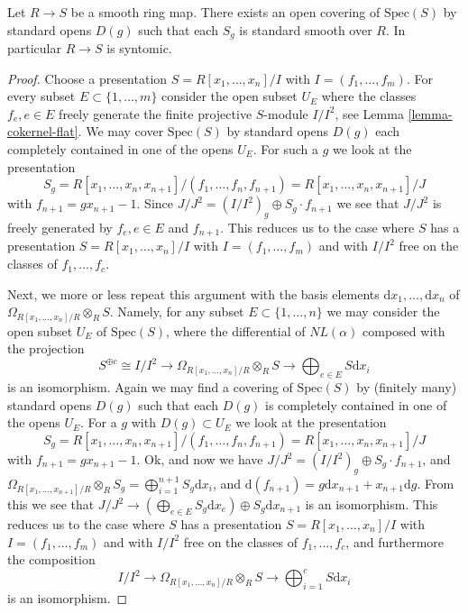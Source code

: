 \begin{lemma}
\label{lemma-smooth-syntomic}
Let $R \to S$ be a smooth ring map.
There exists an open covering of $\text{Spec}(S)$ by
standard opens $D(g)$ such that each $S_g$ is standard smooth
over $R$. In particular $R \to S$ is syntomic.
\end{lemma}

\begin{proof}
Choose a presentation $S = R[x_1, \ldots, x_n]/I$
with $I = (f_1, \ldots, f_m)$. For every subset
$E \subset \{1, \ldots, m\}$ consider the open
subset $U_E$ where the classes $f_e, e\in E$ freely generate
the finite projective $S$-module $I/I^2$, see Lemma \ref{lemma-cokernel-flat}.
We may cover $\text{Spec}(S)$ by standard opens $D(g)$ each
completely contained in one of the opens $U_E$. For such a $g$
we look at the presentation
$$
S_g =
R[x_1, \ldots, x_n, x_{n + 1}]/(f_1, \ldots, f_n, f_{n + 1}) =
R[x_1, \ldots, x_n, x_{n + 1}]/J
$$
with $f_{n + 1} = g x_{n + 1} - 1$. Since
$J/J^2 = (I/I^2)_g \oplus S_g \cdot f_{n + 1}$
we see that $J/J^2$ is freely generated by $f_e, e \in E$ and $f_{n + 1}$.
This reduces us to the case where $S$ has a presentation
$S = R[x_1, \ldots, x_n]/I$ with $I = (f_1, \ldots, f_m)$ and
with $I/I^2$ free on the classes of $f_1, \ldots, f_c$.

\medskip\noindent
Next, we more or less repeat this argument with
the basis elements $\text{d}x_1, \ldots, \text{d}x_n$
of $\Omega_{R[x_1, \ldots, x_n]/R} \otimes_R S$.
Namely, for any subset $E \subset \{1, \ldots, n\}$ we may
consider the open subset $U_E$ of $\text{Spec}(S)$, where
the differential of $NL(\alpha)$ composed with the projection
$$
S^{\oplus c} \cong I/I^2
\longrightarrow
\Omega_{R[x_1, \ldots, x_n]/R} \otimes_R S
\longrightarrow
\bigoplus\nolimits_{e \in E} S\text{d}x_i
$$
is an isomorphism. Again we may find a covering of $\text{Spec}(S)$
by (finitely many) standard opens $D(g)$ such that each $D(g)$
is completely contained in one of the opens $U_E$.
For a $g$ with $D(g) \subset U_E$ we look at the presentation
$$
S_g =
R[x_1, \ldots, x_n, x_{n + 1}]/(f_1, \ldots, f_n, f_{n + 1}) =
R[x_1, \ldots, x_n, x_{n + 1}]/J
$$
with $f_{n + 1} = g x_{n + 1} - 1$. Ok, and now we have
$J/J^2 = (I/I^2)_g \oplus S_g \cdot f_{n + 1}$, and
$\Omega_{R[x_1, \ldots, x_{n + 1}]/R} \otimes_R S_g =
\bigoplus_{i = 1}^{n + 1} S_g \text{d}x_i$, and
$\text{d}(f_{n + 1}) = g \text{d}x_{n + 1} + x_{n + 1} \text{d} g$.
From this  we see that
$J/J^2 \to (\bigoplus_{e \in E} S_g \text{d}x_e) \oplus S_g \text{d}x_{n + 1}$
is an isomorphism.
This reduces us to the case where $S$ has a presentation
$S = R[x_1, \ldots, x_n]/I$ with $I = (f_1, \ldots, f_m)$ and
with $I/I^2$ free on the classes of $f_1, \ldots, f_c$,
and furthermore the composition
$$
I/I^2
\longrightarrow
\Omega_{R[x_1, \ldots, x_n]/R} \otimes_R S
\longrightarrow
\bigoplus\nolimits_{i = 1}^c S\text{d}x_i
$$
is an isomorphism.


\end{proof}
